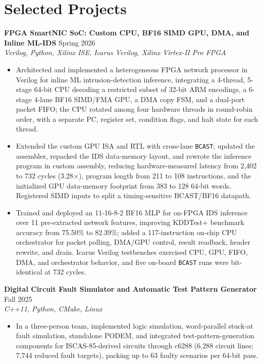 \documentclass[letterpaper,10pt]{article}
\newcommand{\projectheading}[3]{%
  \vspace{3pt}\textbf{#1} \hfill #3 \\[-1pt]
  {\small\textit{#2}}\vspace{1pt}
}
\begin{document}
\section{Selected Projects}
\projectheading{FPGA SmartNIC SoC: Custom CPU, BF16 SIMD GPU, DMA, and Inline ML-IDS}{Verilog, Python, Xilinx ISE, Icarus Verilog, Xilinx Virtex-II Pro FPGA}{Spring 2026}
\begin{itemize}
  \item Architected and implemented a heterogeneous FPGA network processor in Verilog for inline ML intrusion-detection inference, integrating a 4-thread, 5-stage 64-bit CPU decoding a restricted subset of 32-bit ARM encodings, a 6-stage 4-lane BF16 SIMD/FMA GPU, a DMA copy FSM, and a dual-port packet FIFO; the CPU rotated among four hardware threads in round-robin order, with a separate PC, register set, condition flags, and halt state for each thread.
  \item Extended the custom GPU ISA and RTL with cross-lane \texttt{BCAST}; updated the assembler, repacked the IDS data-memory layout, and rewrote the inference program in custom assembly, reducing hardware-measured latency from 2,402 to 732 cycles (3.28$\times$), program length from 211 to 108 instructions, and the initialized GPU data-memory footprint from 383 to 128 64-bit words. Registered SIMD inputs to split a timing-sensitive BCAST/BF16 datapath.
  \item Trained and deployed an 11-16-8-2 BF16 MLP for on-FPGA IDS inference over 11 pre-extracted network features, improving KDDTest+ benchmark accuracy from 75.50\% to 82.39\%; added a 117-instruction on-chip CPU orchestrator for packet polling, DMA/GPU control, result readback, header rewrite, and drain. Icarus Verilog testbenches exercised CPU, GPU, FIFO, DMA, and orchestrator behavior, and five on-board \texttt{BCAST} runs were bit-identical at 732 cycles.
\end{itemize}

\projectheading{Digital Circuit Fault Simulator and Automatic Test Pattern Generator}{C++11, Python, CMake, Linux}{Fall 2025}
\begin{itemize}
  \item In a three-person team, implemented logic simulation, word-parallel stuck-at fault simulation, standalone PODEM, and integrated test-pattern-generation components for ISCAS-85-derived circuits through c6288 (6,288 circuit lines; 7,744 reduced fault targets), packing up to 63 faulty scenarios per 64-bit pass.
\end{itemize}
\end{document}
